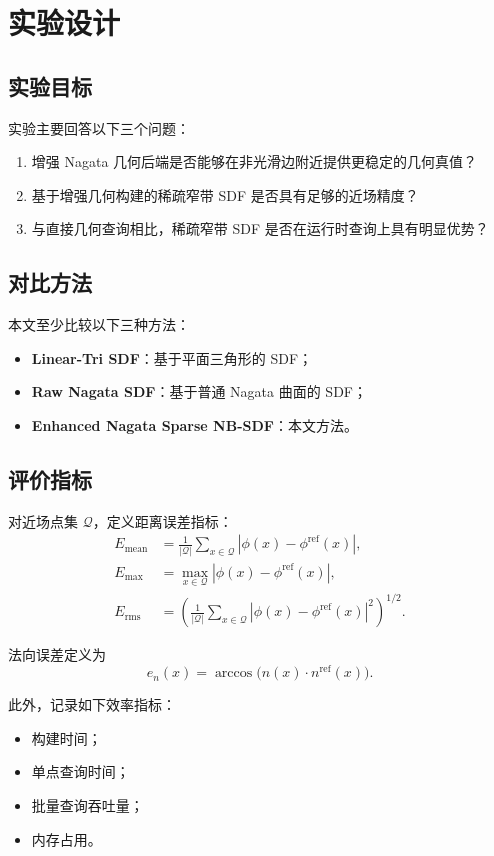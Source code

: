 \documentclass[11pt,a4paper]{ctexart}
\begin{document}
\section{实验设计}

\subsection{实验目标}
实验主要回答以下三个问题：
\begin{enumerate}[leftmargin=2em]
    \item 增强 Nagata 几何后端是否能够在非光滑边附近提供更稳定的几何真值？
    \item 基于增强几何构建的稀疏窄带 SDF 是否具有足够的近场精度？
    \item 与直接几何查询相比，稀疏窄带 SDF 是否在运行时查询上具有明显优势？
\end{enumerate}

\subsection{对比方法}
本文至少比较以下三种方法：
\begin{itemize}[leftmargin=2em]
    \item \textbf{Linear-Tri SDF}：基于平面三角形的 SDF；
    \item \textbf{Raw Nagata SDF}：基于普通 Nagata 曲面的 SDF；
    \item \textbf{Enhanced Nagata Sparse NB-SDF}：本文方法。
\end{itemize}

\subsection{评价指标}
对近场点集 $\mathcal{Q}$，定义距离误差指标：
\begin{align}
E_{\mathrm{mean}} &= \frac{1}{|\mathcal{Q}|}\sum_{x\in\mathcal{Q}} |\phi(x)-\phi^{\mathrm{ref}}(x)|,\\
E_{\max} &= \max_{x\in\mathcal{Q}} |\phi(x)-\phi^{\mathrm{ref}}(x)|,\\
E_{\mathrm{rms}} &= \left(\frac{1}{|\mathcal{Q}|}\sum_{x\in\mathcal{Q}} |\phi(x)-\phi^{\mathrm{ref}}(x)|^2\right)^{1/2}.
\end{align}

法向误差定义为
\begin{equation}
e_n(x)=\arccos\big(n(x)\cdot n^{\mathrm{ref}}(x)\big).
\end{equation}

此外，记录如下效率指标：
\begin{itemize}[leftmargin=2em]
    \item 构建时间；
    \item 单点查询时间；
    \item 批量查询吞吐量；
    \item 内存占用。
\end{itemize}
\end{document}
